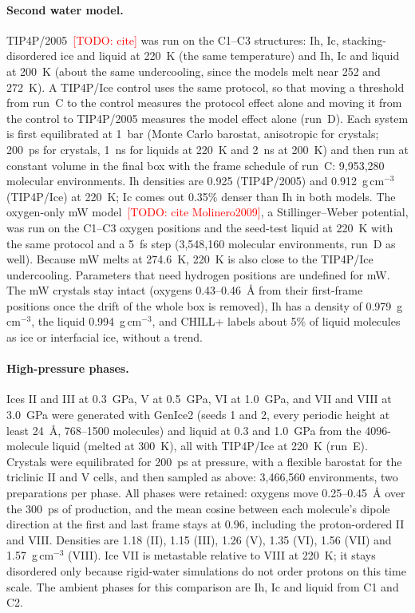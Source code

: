 \documentclass{template1}
\newcommand{\todo}[1]{\textcolor{red}{[TODO: #1]}}
\begin{document}
\paragraph{Second water model.} TIP4P/2005~\todo{cite} was run on the
C1--C3 structures: Ih, Ic, stacking-disordered ice and liquid at 220~K (the
same temperature) and Ih, Ic and liquid at 200~K (about the same
undercooling, since the models melt near 252 and 272~K). A TIP4P/Ice control
uses the same protocol, so that moving a threshold from run~C to the control
measures the protocol effect alone and moving it from the control to
TIP4P/2005 measures the model effect alone (run~D). Each system is first
equilibrated at 1~bar (Monte Carlo barostat, anisotropic for crystals;
200~ps for crystals, 1~ns for liquids at 220~K and 2~ns at 200~K) and then
run at constant volume in the final box with the frame schedule of run~C:
9,953,280 molecular environments. Ih densities are 0.925 (TIP4P/2005) and
0.912~g\,cm$^{-3}$ (TIP4P/Ice) at 220~K; Ic comes out 0.35\% denser than Ih
in both models. The oxygen-only mW model~\todo{cite Molinero2009}, a
Stillinger--Weber potential, was run on the C1--C3 oxygen positions and the
seed-test liquid at 220~K with the same protocol and a 5~fs step (3,548,160
molecular environments, run~D as well). Because mW melts at 274.6~K, 220~K is
also close to the TIP4P/Ice undercooling. Parameters that need hydrogen
positions are undefined for mW. The mW crystals stay intact (oxygens
0.43--0.46~\AA{} from their first-frame positions once the drift of the whole
box is removed), Ih has a density of 0.979~g\,cm$^{-3}$, the liquid
0.994~g\,cm$^{-3}$, and CHILL+ labels about 5\% of liquid molecules as ice or
interfacial ice, without a trend.

\paragraph{High-pressure phases.} Ices II and III at 0.3~GPa, V at 0.5~GPa,
VI at 1.0~GPa, and VII and VIII at 3.0~GPa were generated with GenIce2 (seeds
1 and 2, every periodic height at least 24~\AA, 768--1500 molecules) and
liquid at 0.3 and 1.0~GPa from the 4096-molecule liquid (melted at 300~K),
all with TIP4P/Ice at 220~K (run~E). Crystals were equilibrated for 200~ps at
pressure, with a flexible barostat for the triclinic II and V cells, and
then sampled as above: 3,466,560 environments, two preparations per phase.
All phases were retained: oxygens move 0.25--0.45~\AA{} over the 300~ps of
production, and the mean cosine between each molecule's dipole direction at
the first and last frame stays at 0.96, including the proton-ordered II and
VIII. Densities are 1.18 (II), 1.15 (III), 1.26 (V), 1.35 (VI), 1.56 (VII)
and 1.57~g\,cm$^{-3}$ (VIII). Ice VII is metastable relative to VIII at
220~K; it stays disordered only because rigid-water simulations do not order
protons on this time scale. The ambient phases for this comparison are Ih,
Ic and liquid from C1 and C2.
\end{document}
